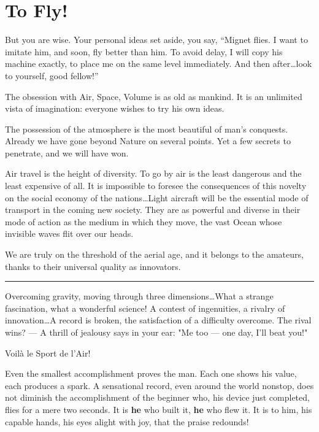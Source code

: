 \documentclass{book}
\newcommand*\sectline{
  \vspace{5pt}
  \begin{center}
    \rule{0.5\linewidth}{\linethickness}
  \end{center}
  \vspace{5pt}
}
\begin{document}
\section{To Fly!}

But you are wise. Your personal ideas set aside, you say, ``Mignet
flies. I want to imitate him, and soon, fly better than him. To avoid
delay, I will copy his machine exactly, to place me on the same level
immediately. And then after\ldots look to yourself, good fellow!''

The obsession with Air, Space, Volume is as old as mankind. It is an
unlimited vista of imagination: everyone wishes to try his own ideas.

The possession of the atmosphere is the most beautiful of man's
conquests.  Already we have gone beyond Nature on several points. Yet
a few secrets to penetrate, and we will have won.

Air travel is the height of diversity. To go by air is the least
dangerous and the least expensive of all.  It is impossible to foresee
the consequences of this novelty on the social economy of the
nations\ldots Light aircraft will be the essential mode of transport
in the coming new society.  They are as powerful and diverse in their
mode of action as the medium in which they move, the vast Ocean whose
invisible waves flit over our heads.

We are truly on the threshold of the aerial age, and it belongs to the
amateurs, thanks to their universal quality as innovators.

\sectline

Overcoming gravity, moving through three dimensions\ldots What a
strange fascination, what a wonderful science!  A contest of
ingenuities, a rivalry of innovation\ldots A record is broken, the
satisfaction of a difficulty overcome. The rival wins? --- A thrill of
jealousy says in your ear: "Me too --- one day, I'll beat you!"

{
  \selectfont
  \begin{center}
    {\Large Voil\`a le Sport de l'Air!}
  \end{center}
}

Even the smallest accomplishment proves the man.  Each one shows his
value, each produces a spark. A sensational record, even around the
world nonstop, does not diminish the accomplishment of the beginner
who, his device just completed, flies for a mere two seconds.  It is
\textbf{he} who built it, \textbf{he} who flew it.  It is to him, his
capable hands, his eyes alight with joy, that the praise redounds!
\end{document}
